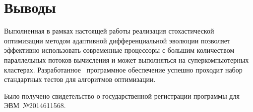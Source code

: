 \section{Выводы}

Выполненная в рамках настоящей работы реализация стохастической
оптимизации методом адаптивной дифференциальной эволюции позволяет
эффективно использовать современные процессоры с большим количеством
параллельных потоков вычисления и может выполняться на
суперкомпьютерных кластерах.  Разработанное~\cite{JADE-web} программное обеспечение
успешно проходит набор стандартных тестов для алгоритмов оптимизации.

 Было получено
свидетельство о государственной регистрации программы для
ЭВМ~№2014611568.
\clearpage